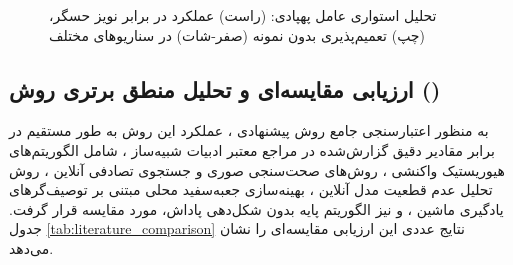 \documentclass[oneside,openany,a4paper,12pt,draft]{article}
\begin{document}
\begin{figure}[H]
  \centering
  \caption{تحلیل استواری عامل پهپادی: (راست) عملکرد در برابر نویز حسگر، (چپ) تعمیم‌پذیری بدون نمونه (صفر-شات) در سناریوهای مختلف}
  \label{fig:dartsim_robustness}
\end{figure}

\subsection{ارزیابی مقایسه‌ای و تحلیل منطق برتری روش  ()}
به منظور اعتبارسنجی جامع روش پیشنهادی ، عملکرد این روش به طور مستقیم در برابر مقادیر دقیق گزارش‌شده در مراجع معتبر ادبیات شبیه‌ساز ، شامل الگوریتم‌های هیوریستیک واکنشی \cite{MorenoDART2019}، روش‌های صحت‌سنجی صوری و جستجوی تصادفی آنلاین  \cite{kinneer2021information}، روش تحلیل عدم قطعیت مدل آنلاین  \cite{camilli2025many}، بهینه‌سازی جعبه‌سفید محلی مبتنی بر توصیف‌گرهای یادگیری ماشین  \cite{negri2026efficient}، و نیز الگوریتم پایه  بدون شکل‌دهی پاداش، مورد مقایسه قرار گرفت. جدول \ref{tab:literature_comparison} نتایج عددی این ارزیابی مقایسه‌ای را نشان می‌دهد.
\end{document}
